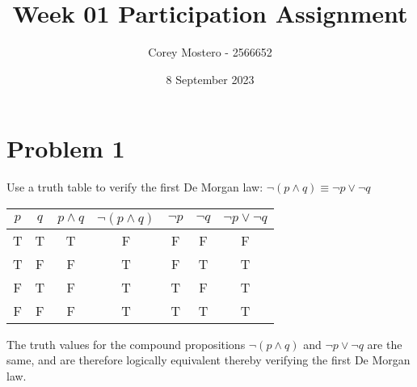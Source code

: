 \documentclass{article}
\title{Week 01 Participation Assignment}
\author{Corey Mostero - 2566652}
\date{8 September 2023}
\begin{document}
\newcommand{\hr}{\par\noindent\rule{\textwidth}{0.4pt}}

\newcommand{\bc}[1]{
	\begin{equation*}
		\begin{boxed}
			{#1}
		\end{boxed}
	\end{equation*}
}

\newcommand{\cond}[2]{
	\ifmmode
		{#1} \quad {#2}
	\else
		$$ {#1} \quad {#2} $$
	\fi
}

\newcommand{\matr}[1]{
	\ifmmode \bm{#1}
	\else \textit{\textbf{#1}}
	\fi
}
\newcommand{\vect}[1]{
	\ifmmode \mathbf{#1}
	\else \textbf{#1}
	\fi
}


\newcommand{\cmt}[1]{}

\maketitle
\newpage

\tableofcontents

\section{Problem 1}

Use a truth table to verify the first De Morgan law: $ \neg ( p \land q ) \equiv \neg p \lor \neg q $

\begin{tabular}{ | c | c | c | c | c | c | c | }
	$ p $ & $ q $ & $ p \land q $ & $ \neg ( p \land q ) $ & $ \neg p $ & $ \neg q $ & $ \neg p \lor \neg q $ \\
	\hline
	T & T & T & F & F & F & F \\
	T & F & F & T & F & T & T \\
	F & T & F & T & T & F & T \\
	F & F & F & T & T & T & T
\end{tabular}

The truth values for the compound propositions $ \neg ( p \land q ) $ and $ \neg p \lor \neg q $ are the same, and are therefore logically equivalent thereby verifying the first De Morgan law.
\end{document}
